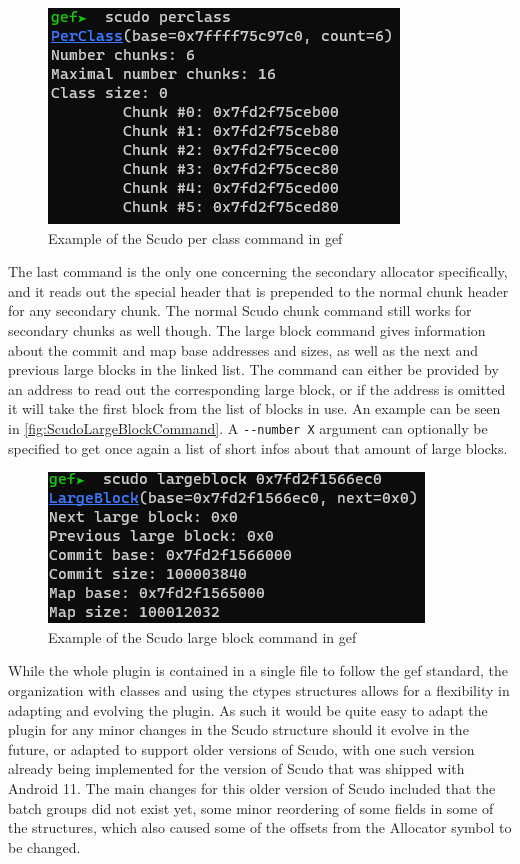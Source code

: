 \documentclass[a4paper,11pt,oneside]{report}
\begin{document}
\begin{figure}[h!]
  \centering
  \includegraphics{figures/ScudoPerClassCommand.png}
  \caption{Example of the Scudo per class command in gef}
  \label{fig:ScudoPerClassCommand}
\end{figure}

The last command is the only one concerning the secondary allocator specifically,
and it reads out the special header that is prepended to the normal chunk header
for any secondary chunk. The normal Scudo chunk command still works for secondary
chunks as well though. The large block command gives information about the
commit and map base addresses and sizes, as well as the next and previous large
blocks in the linked list. The command can either be provided by an address
to read out the corresponding large block, or if the address is omitted it will
take the first block from the list of blocks in use. An example can be seen in
\autoref{fig:ScudoLargeBlockCommand}. A \verb|--number X| argument can optionally be
specified to get once again a list of short infos about that amount of large
blocks.

\begin{figure}[h!]
  \centering
  \includegraphics{figures/ScudoLargeBlockCommand.png}
  \caption{Example of the Scudo large block command in gef}
  \label{fig:ScudoLargeBlockCommand}
\end{figure}

While the whole plugin is contained in a single file to follow the gef standard,
the organization with classes and using the ctypes structures allows for a
flexibility in adapting and evolving the plugin. As such it would be quite
easy to adapt the plugin for any minor changes in the Scudo structure should
it evolve in the future, or adapted to support older versions of Scudo, with
one such version already being implemented for the version of Scudo that was
shipped with Android 11. The main changes for this older version of Scudo
included that the batch groups did not exist yet, some minor reordering of
some fields in some of the structures, which also caused some of the offsets
from the Allocator symbol to be changed.
\end{document}
